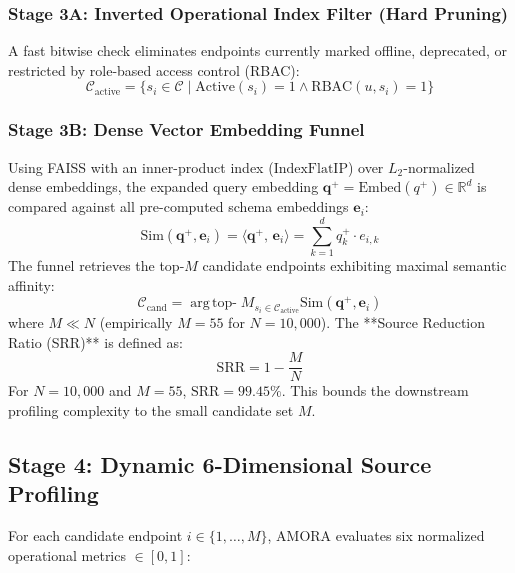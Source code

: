 \subsubsection{Stage 3A: Inverted Operational Index Filter (Hard Pruning)}
A fast bitwise check eliminates endpoints currently marked offline, deprecated, or restricted by role-based access control (RBAC):
\begin{equation}
    \mathcal{C}_{\text{active}} = \{s_i \in \mathcal{C} \mid \text{Active}(s_i) = 1 \land \text{RBAC}(u, s_i) = 1\}
\end{equation}

\subsubsection{Stage 3B: Dense Vector Embedding Funnel}
Using FAISS with an inner-product index ($\text{IndexFlatIP}$) over $L_2$-normalized dense embeddings, the expanded query embedding $\mathbf{q}^+ = \text{Embed}(q^+) \in \mathbb{R}^d$ is compared against all pre-computed schema embeddings $\mathbf{e}_i$:
\begin{equation}
    \text{Sim}(\mathbf{q}^+, \mathbf{e}_i) = \langle \mathbf{q}^+, \, \mathbf{e}_i \rangle = \sum_{k=1}^d q^+_k \cdot e_{i,k}
\end{equation}
The funnel retrieves the top-$M$ candidate endpoints exhibiting maximal semantic affinity:
\begin{equation}
    \mathcal{C}_{\text{cand}} = \operatorname{arg\,top-}M_{s_i \in \mathcal{C}_{\text{active}}} \text{Sim}(\mathbf{q}^+, \mathbf{e}_i)
\end{equation}
where $M \ll N$ (empirically $M = 55$ for $N = 10,000$). The **Source Reduction Ratio (SRR)** is defined as:
\begin{equation}
    \text{SRR} = 1 - \frac{M}{N}
    \label{eq:srr_def}
\end{equation}
For $N = 10,000$ and $M = 55$, $\text{SRR} = 99.45\%$. This bounds the downstream profiling complexity to the small candidate set $M$.

\subsection{Stage 4: Dynamic 6-Dimensional Source Profiling}
For each candidate endpoint $i \in \{1, \dots, M\}$, AMORA evaluates six normalized operational metrics $\in [0, 1]$:

